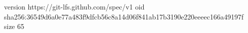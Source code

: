 version https://git-lfs.github.com/spec/v1
oid sha256:36549d6a0e77a483f9dfcb56c8a14d06f841ab17b3190e220eeeec166a49197f
size 65

